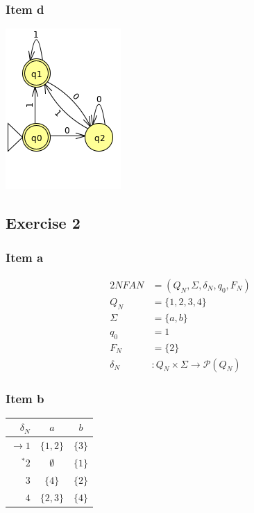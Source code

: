 \documentclass[docid=TP06]{tcom_TP}
\begin{document}
{\subsubsection{Item d}
\begin{center} \includegraphics[scale=0.5]{TP06_1_d} \end{center}
\subsection{Exercise 2}
\subsubsection{Item a}
\begin{alignat*}{2}
	NFA N    &= (Q_N, \Sigma, \delta_N, q_0, F_N)\\
	Q_N      &= \{1,2,3,4\}\\
	\Sigma   &= \{a,b\}\\
	q_0      &= 1\\
	F_N      &= \{2\}\\
	\delta_N &\colon Q_N \times \Sigma \rightarrow \mathscr{P}(Q_N)
\end{alignat*}
\subsubsection{Item b}
\begin{center} \begin{tabular}{r | c c}
	$\delta_N     $ & $a      $ & $b    $ \\ \hline
	$\rightarrow 1$ & $\{1,2\}$ & $\{3\}$ \\
	$      ^* 2$ & $\emptyset$ & $\{1\}$ \\
	$            3$ & $\{4\}  $ & $\{2\}$ \\
	$            4$ & $\{2,3\}$ & $\{4\}$
\end{tabular} \end{center}
}
\end{document}
